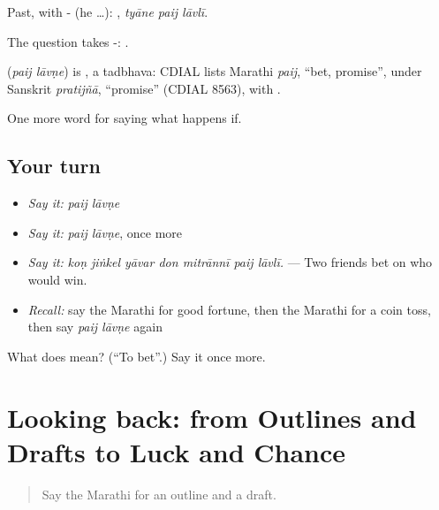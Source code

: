 Past, with - (he …):   , \emph{tyāne paij lāvlī}.

The question takes -:   .

\begin{cousinweb}
\textbf{ } (\emph{paij lāvṇe}) is , a tadbhava: CDIAL lists Marathi \emph{paij}, \textquotedblleft{}bet, promise\textquotedblright{}, under Sanskrit \emph{pratijñā}, \textquotedblleft{}promise\textquotedblright{} (CDIAL 8563), with .
\end{cousinweb}

\begin{grammarlens}[title={What you've built}]
One more word for saying what happens if.
\end{grammarlens}

\subsection*{Your turn}
\begin{itemize}
\raggedright
  \item \emph{Say it:} \emph{paij lāvṇe}
  \item \emph{Say it:} \emph{paij lāvṇe}, once more
  \item \emph{Say it:} \emph{koṇ jiṅkel yāvar don mitrānnī paij lāvlī.} — Two friends bet on who would win.
  \item \emph{Recall:} say the Marathi for good fortune, then the Marathi for a coin toss, then say \emph{paij lāvṇe} again
\end{itemize}

\begin{tcolorbox}[breakable,colback=teal!4,colframe=teal!35!black,title={Before you move on}]
What does   mean? (\textquotedblleft{}To bet\textquotedblright{}.) Say it once more.
\end{tcolorbox}
\section[(dialogue)]{Looking back: from Outlines and Drafts to Luck and Chance}

\label{lesson:MR-R550-review-544-550}



\begin{quote}
Say the Marathi for an outline and a draft.
\end{quote}

